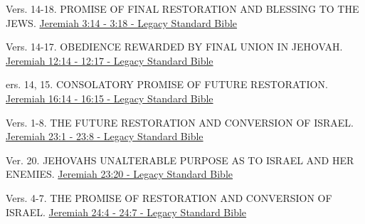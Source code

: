 \documentclass[
  ignorenonframetext,
]{beamer}
\begin{document}
\begin{frame}{3}
\label{section-75}
\begin{block}{Vers. 14-18. PROMISE OF FINAL RESTORATION AND BLESSING TO
THE JEWS.}
\label{vers.-14-18.-promise-of-final-restoration-and-blessing-to-the-jews.}
\href{https://read.lsbible.org/?q=jer3\%3A14-18}{Jeremiah 3:14 - 3:18 -
Legacy Standard Bible}
\end{block}
\end{frame}

\begin{frame}{12}
\label{section-76}
Vers. 14-17. OBEDIENCE REWARDED BY FINAL UNION IN JEHOVAH.\\
\href{https://read.lsbible.org/?q=jer12\%3A14-17}{Jeremiah 12:14 - 12:17
- Legacy Standard Bible}
\end{frame}

\begin{frame}{16}
\label{section-77}
\begin{block}{ers. 14, 15. CONSOLATORY PROMISE OF FUTURE RESTORATION.}
\label{ers.-14-15.-consolatory-promise-of-future-restoration.}
\href{https://read.lsbible.org/?q=jer16\%3A14-15}{Jeremiah 16:14 - 16:15
- Legacy Standard Bible}
\end{block}
\end{frame}

\begin{frame}{23}
\label{section-78}
\begin{block}{Vers. 1-8. THE FUTURE RESTORATION AND CONVERSION OF
ISRAEL.}
\label{vers.-1-8.-the-future-restoration-and-conversion-of-israel.}
\href{https://read.lsbible.org/?q=jer23\%3A1-8}{Jeremiah 23:1 - 23:8 -
Legacy Standard Bible}
\end{block}

\begin{block}{Ver. 20. JEHOVAH\textquotesingle S UNALTERABLE PURPOSE AS
TO ISRAEL AND HER ENEMIES.}
\label{ver.-20.-jehovahs-unalterable-purpose-as-to-israel-and-her-enemies.}
\href{https://read.lsbible.org/?q=jer23\%3A20}{Jeremiah 23:20 - Legacy
Standard Bible}
\end{block}
\end{frame}

\begin{frame}{24}
\label{section-79}
\begin{block}{Vers. 4-7. THE PROMISE OF RESTORATION AND CONVERSION OF
ISRAEL.}
\label{vers.-4-7.-the-promise-of-restoration-and-conversion-of-israel.}
\href{https://read.lsbible.org/?q=jer24\%3A4-7}{Jeremiah 24:4 - 24:7 -
Legacy Standard Bible}
\end{block}
\end{frame}
\end{document}
